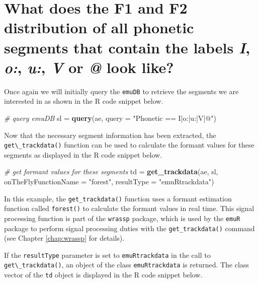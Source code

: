 \documentclass[]{book}
\newenvironment{Shaded}{\begin{snugshade}}{\end{snugshade}}
\newcommand{\CommentTok}[1]{\textcolor[rgb]{0.56,0.35,0.01}{\textit{#1}}}
\newcommand{\DataTypeTok}[1]{\textcolor[rgb]{0.13,0.29,0.53}{#1}}
\newcommand{\KeywordTok}[1]{\textcolor[rgb]{0.13,0.29,0.53}{\textbf{#1}}}
\newcommand{\NormalTok}[1]{#1}
\newcommand{\StringTok}[1]{\textcolor[rgb]{0.31,0.60,0.02}{#1}}
\theoremstyle{definition}
\theoremstyle{definition}
\theoremstyle{definition}
\theoremstyle{remark}
\begin{document}
\hypertarget{sec:app-chap-useCases-q2}{%
\section{\texorpdfstring{What does the F1 and F2 distribution of all
phonetic segments that contain the labels \emph{I}, \emph{o:},
\emph{u:}, \emph{V} or \emph{@} look
like?}{What does the F1 and F2 distribution of all phonetic segments that contain the labels I, o:, u:, V or @ look like?}}\label{sec:app-chap-useCases-q2}}

Once again we will initially query the \texttt{emuDB} to retrieve the
segments we are interested in as shown in the R code snippet below.

\begin{Shaded}
\begin{Highlighting}[]
\CommentTok{# query emuDB}
\NormalTok{sl =}\StringTok{ }\KeywordTok{query}\NormalTok{(ae, }\DataTypeTok{query =} \StringTok{"Phonetic == I|o:|u:|V|@"}\NormalTok{)}
\end{Highlighting}
\end{Shaded}

Now that the necessary segment information has been extracted, the
\texttt{get\textbackslash{}\_trackdata()} function can be used to
calculate the formant values for these segments as displayed in the R
code snippet below.

\begin{Shaded}
\begin{Highlighting}[]
\CommentTok{# get formant values for these segments}
\NormalTok{td =}\StringTok{ }\KeywordTok{get_trackdata}\NormalTok{(ae, sl,}
                   \DataTypeTok{onTheFlyFunctionName =} \StringTok{"forest"}\NormalTok{,}
                   \DataTypeTok{resultType =} \StringTok{"emuRtrackdata"}\NormalTok{)}
\end{Highlighting}
\end{Shaded}

In this example, the \texttt{get\_trackdata()} function uses a formant
estimation function called \texttt{forest()} to calculate the formant
values in real time. This signal processing function is part of the
\texttt{wrassp} package, which is used by the \texttt{emuR} package to
perform signal processing duties with the \texttt{get\_trackdata()}
command (see Chapter \ref{chap:wrassp} for details).

If the \texttt{resultType} parameter is set to \texttt{emuRtrackdata} in
the call to \texttt{get\textbackslash{}\_trackdata()}, an object of the
class \texttt{emuRtrackdata} is returned. The class vector of the
\texttt{td} object is displayed in the R code snippet below.
\end{document}
